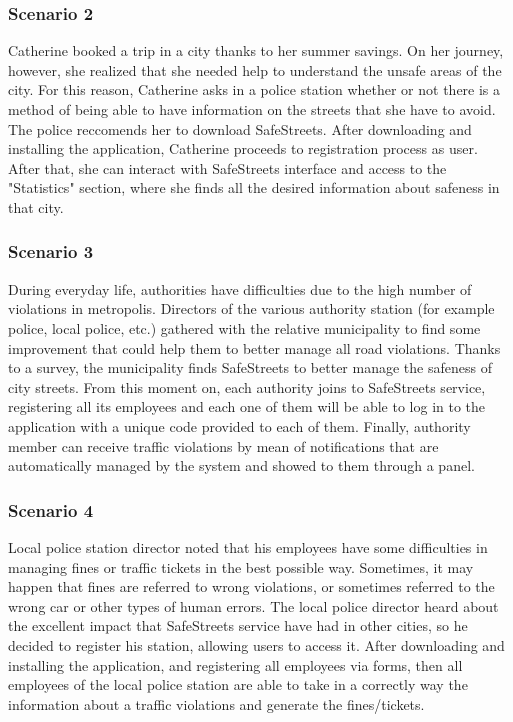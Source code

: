 \documentclass[12pt]{article}
\begin{document}
\subsubsection{Scenario 2}
\vspace{2mm}
Catherine booked a trip in a city thanks to her summer savings. On her journey, however, she realized that she needed help to understand the unsafe areas of the city. For this reason, Catherine asks in a police station whether or not there is a method of being able to have information on the streets that she have to avoid. The police reccomends her to download SafeStreets. After downloading and installing the application, Catherine proceeds to registration process as user. After that, she can interact with SafeStreets interface and access to the "Statistics" section, where she finds all the desired information about safeness in that city. 

\subsubsection{Scenario 3}
\vspace{2mm}

During everyday life, authorities have difficulties due to the high number of violations in metropolis. Directors of the various authority station (for example police, local police, etc.) gathered with the relative municipality to find some improvement that could help them to better manage all road violations. Thanks to a survey, the municipality finds SafeStreets to better manage the safeness of city streets. From this moment on, each authority joins to SafeStreets service, registering all its employees and each one of them will be able to log in to the application with a unique code provided to each of them. Finally, authority member can receive traffic violations by mean of notifications that are automatically managed by the system and showed to them through a panel.


\subsubsection{Scenario 4}
\vspace{2mm}
Local police station director noted that his employees have some difficulties in managing fines or traffic tickets in the best possible way. Sometimes, it may happen that fines are referred to wrong violations, or sometimes referred to the wrong car or other types of human errors. The local police director heard about the excellent impact that SafeStreets service have had in other cities, so he  decided to register his station, allowing users to access it. After downloading and installing the application, and registering all employees via forms, then all employees of the local police station are able to take in a correctly way the information about a traffic violations and generate the fines/tickets. 
\end{document}
